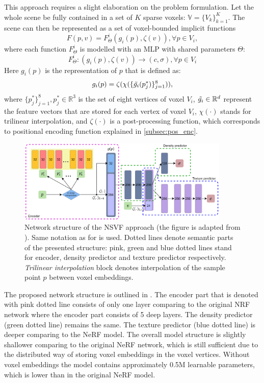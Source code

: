 This approach requires a slight elaboration on the problem formulation.
Let the whole scene be fully contained in a set of $K$ sparse voxels: $\mathbb{V} = \{V_k\}_{k=1}^K$.
The scene can then be represented as a set of voxel-bounded implicit functions
\begin{equation}
    F(p, v) = F_\Theta^i(g_i(p), \zeta(v)), \forall p \in V_i,
\end{equation}
where each function $F_\Theta^i$ is modelled with an MLP with shared parameters $\Theta$:
\begin{equation}
    F_\Theta^i: (g_i(p), \zeta(v)) \xrightarrow{} (c, \sigma), \forall p \in V_i
\end{equation}
Here $g_i(p)$ is the representation of $p$ that is defined as:
\begin{equation}
    g_i(p) = \zeta ( \chi ( \{\Tilde{g_i}(p_j^*)\}_{j=1}^8 ) ),
\end{equation}
where $\{p_j^*\}_{j=1}^8, p_j^* \in \mathbb{R}^3$ is the set of eight vertices of voxel $V_i$,
$\Tilde{g_i} \in \mathbb{R}^d$ represent the feature vectors that are stored for each vertex of voxel $V_i$,
$\chi(\cdot)$ stands for trilinear interpolation,
and $\zeta(\cdot)$ is a post-processing function,
which corresponds to positional encoding function explained in \ref{subsec:pos_enc}.


\begin{figure}[!htb]
    \centering
    \includegraphics[width=0.9\textwidth]{figures/vanilla_nsvf.png}
    \caption{Network structure of the NSVF approach
(the figure is adapted from \cite{liu2021neural}).
Same notation as for  is used.
Dotted lines denote semantic parts of the presented structure:
pink, green and blue dotted lines stand for encoder, density predictor and texture predictor respectively.
\textit{Trilinear interpolation} block denotes interpolation of the sample point $p$ between voxel embeddings.}
    \label{fig:nsvf_structure}
\end{figure}

The proposed network structure is outlined in .
The encoder part that is denoted with pink dotted line
consists of only one layer comparing to the original NRF network
where the encoder part consists of 5 deep layers.
The density predictor (green dotted line) remains the same.
The texture predictor (blue dotted line) is deeper comparing to the NeRF model.
The overall model structure is slightly shallower comparing to the original NeRF network,
which is still sufficient due to the distributed way of storing voxel embeddings in the voxel vertices.
Without voxel embeddings the model contains approximately 0.5M learnable parameters,
which is lower than in the original NeRF model.

